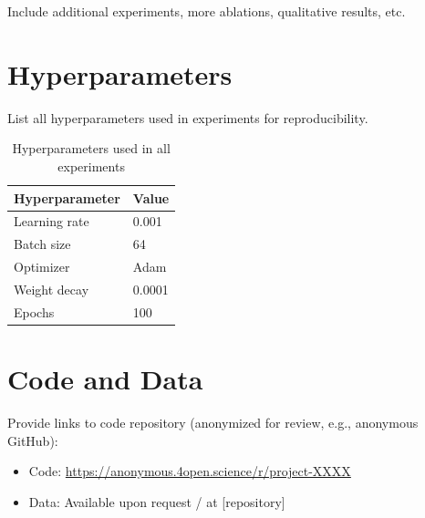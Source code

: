 \documentclass{article}
\begin{document}
Include additional experiments, more ablations, qualitative results, etc.

\section{Hyperparameters}
\label{app:hyperparameters}

List all hyperparameters used in experiments for reproducibility.

\begin{table}[h]
\centering
\caption{Hyperparameters used in all experiments}
\begin{tabular}{ll}
\toprule
Hyperparameter & Value \\
\midrule
Learning rate & 0.001 \\
Batch size & 64 \\
Optimizer & Adam \\
Weight decay & 0.0001 \\
Epochs & 100 \\
\bottomrule
\end{tabular}
\end{table}

\section{Code and Data}
\label{app:code}

Provide links to code repository (anonymized for review, e.g., anonymous GitHub):
\begin{itemize}
    \item Code: \url{https://anonymous.4open.science/r/project-XXXX}
    \item Data: Available upon request / at [repository]
\end{itemize}


\end{document}
